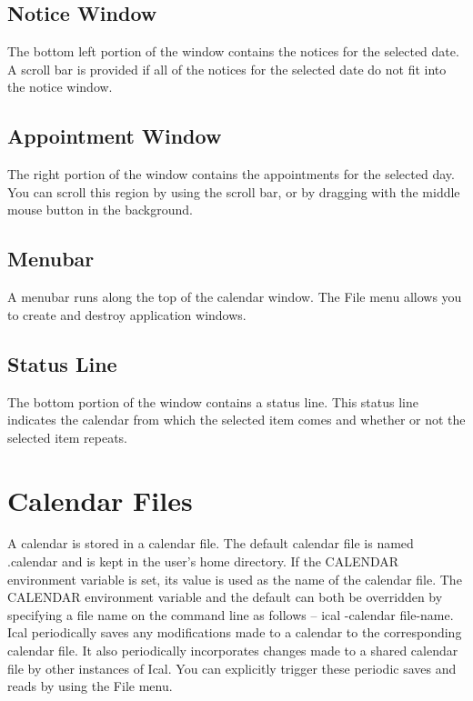 \documentclass[a4paper,english]{article}
\begin{document}
    \subsection{Notice Window}
        The bottom left portion of the window contains the notices for
        the selected date. A scroll bar is provided if all of the
        notices for the selected date do not fit into the notice
        window.

    \subsection{Appointment Window}
        The right portion of the window contains the appointments for
        the selected day.  You can scroll this region by using the
        scroll bar, or by dragging with the middle mouse button in the
        background.

    \subsection{Menubar}
        A menubar runs along the top of the calendar window.  The File
        menu allows you to create and destroy application windows.

    \subsection{Status Line}
        The bottom portion of the window contains a status line. This
        status line indicates the calendar from which the selected
        item comes and whether or not the selected item repeats.

\section{Calendar Files}
    A calendar is stored in a calendar file. The default calendar file
    is named .calendar and is kept in the user's home directory. If
    the CALENDAR environment variable is set, its value is used as the
    name of the calendar file. The CALENDAR environment variable and
    the default can both be overridden by specifying a file name on
    the command line as follows -- ical -calendar file-name.  Ical
    periodically saves any modifications made to a calendar to the
    corresponding calendar file. It also periodically incorporates
    changes made to a shared calendar file by other instances of Ical.
    You can explicitly trigger these periodic saves and reads by using
    the File menu.
\end{document}

